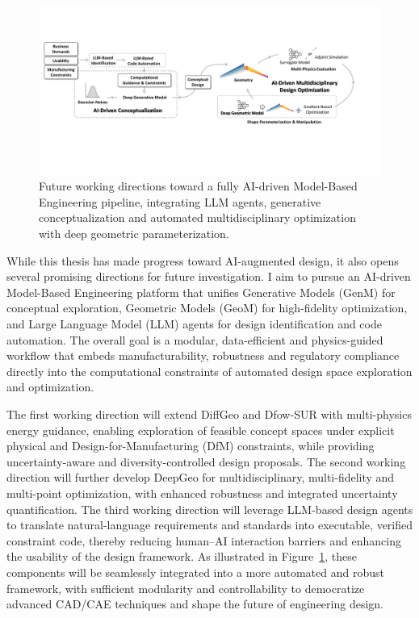 \begin{figure}[!t]
    \centering
    \includegraphics[width=1\linewidth]{conclusion/fig/future_work.pdf}
    \caption{Future working directions toward a fully AI-driven Model-Based Engineering pipeline, integrating LLM agents, generative conceptualization and automated multidisciplinary optimization with deep geometric parameterization.}
    \label{conclusion:fig:future_work}
\end{figure}

While this thesis has made progress toward AI-augmented design, it also opens several promising directions for future investigation. I aim to pursue an AI-driven Model-Based Engineering platform that unifies Generative Models (GenM) for conceptual exploration, Geometric Models (GeoM) for high-fidelity optimization, and Large Language Model (LLM) agents for design identification and code automation. The overall goal is a modular, data-efficient and physics-guided workflow that embeds manufacturability, robustness and regulatory compliance directly into the computational constraints of automated design space exploration and optimization. 

The first working direction will extend DiffGeo and Dfow-SUR with multi-physics energy guidance, enabling exploration of feasible concept spaces under explicit physical and Design-for-Manufacturing (DfM) constraints, while providing uncertainty-aware and diversity-controlled design proposals. The second working direction will further develop DeepGeo for multidisciplinary, multi-fidelity and multi-point optimization, with enhanced robustness and integrated uncertainty quantification. The third working direction will leverage LLM-based design agents to translate natural-language requirements and standards into executable, verified constraint code, thereby reducing human–AI interaction barriers and enhancing the usability of the design framework. As illustrated in Figure~\ref{conclusion:fig:future_work}, these components will be seamlessly integrated into a more automated and robust framework, with sufficient modularity and controllability to democratize advanced CAD/CAE techniques and shape the future of engineering design.